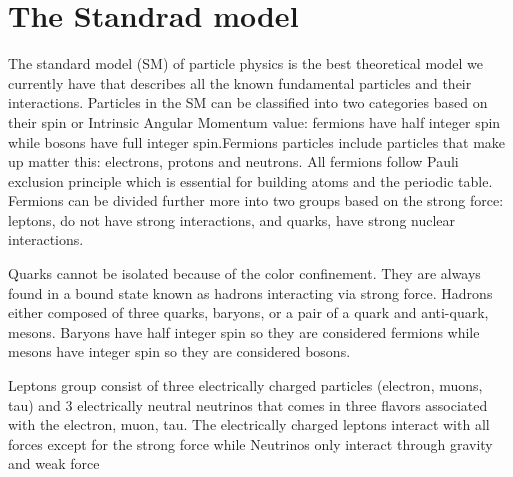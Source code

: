 


\section{The Standrad model}
The standard model (SM) of particle physics is the best theoretical model we currently have that describes all the known fundamental particles and their interactions. Particles in the SM can be classified into two categories based on their spin or Intrinsic Angular Momentum value: fermions have half integer spin while bosons have full integer spin.Fermions particles include particles that make up matter this: electrons, protons and neutrons. All fermions follow Pauli exclusion principle which is essential for building atoms and the periodic table. Fermions can be divided further more into two groups based on the strong force: leptons, do not have strong interactions, and quarks, have strong nuclear interactions.

Quarks cannot be isolated because of the color confinement. They are always found in a bound state known as hadrons interacting via strong force. Hadrons either composed of three quarks, baryons, or a pair of a quark and anti-quark, mesons. Baryons have half integer spin so they are considered fermions while mesons have integer spin so they are considered bosons.

Leptons group consist of three electrically charged particles (electron, muons, tau) and 3 electrically neutral neutrinos that comes in three flavors associated with the electron, muon, tau. The electrically charged leptons interact with all forces except for the strong force while Neutrinos only interact through gravity and weak force

